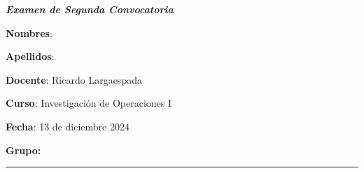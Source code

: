 \documentclass[11pt,paper=a4,answers, addpoints]{exam}
\begin{document}
\noprintanswers
\shorthandoff{<>}
\thispagestyle{empty}
\begin{center}
    \textit{\textbf{Examen de Segunda Convocatoria}}
\end{center}
\noindent
\vspace{-.1cm}
\begin{minipage}[t]{.6\textwidth}%
  {\bfseries Nombres}: \makebox[.75\textwidth]{\hrulefill} \par
  {\bfseries Apellidos}: \makebox[.75\textwidth]{\hrulefill} \par
  {\bfseries Docente}: Ricardo Largaespada
\end{minipage}%
\hfill
\begin{minipage}[t]{.4\textwidth}%
  {\bfseries Curso}: Investigación de Operaciones I \par
  {\bfseries Fecha}: 13 de diciembre 2024 \par
  {\bfseries Grupo:} 
  \vspace{1ex}
\end{minipage}    \hfill
  \rule{\textwidth}{1pt}

\end{document}
